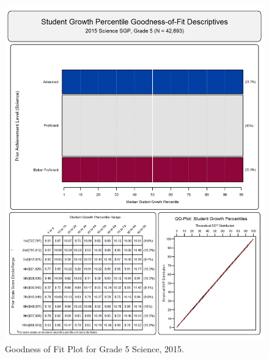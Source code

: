 \documentclass[12pt]{article}
\begin{document}
\begin{figure}[htbp]
\centering
\includegraphics{../img/Goodness_of_Fit/SCIENCE.2015/2015_SCIENCE_5;2014_SCIENCE_4.png}
\caption{Goodness of Fit Plot for Grade 5 Science, 2015.}
\end{figure}
\end{document}
